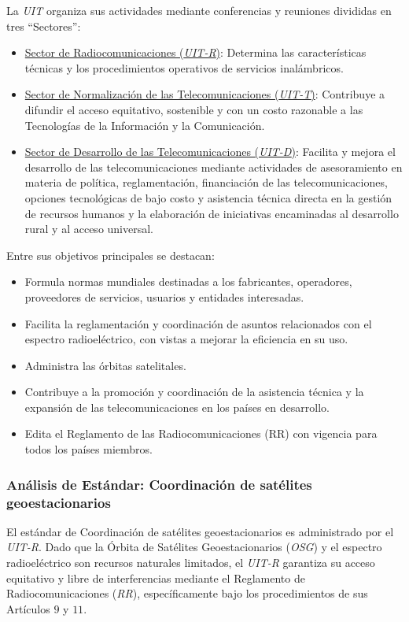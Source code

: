 \documentclass[12pt]{article}
\begin{document}
La \textit{UIT} organiza sus actividades mediante conferencias y reuniones divididas en tres ``Sectores'':
\begin{itemize}
    \item \underline{Sector de Radiocomunicaciones (\textit{UIT-R})}: Determina las características técnicas y los procedimientos operativos de servicios inalámbricos.
    \item \underline{Sector de Normalización de las Telecomunicaciones (\textit{UIT-T})}: Contribuye a difundir el acceso equitativo, sostenible y con un costo razonable a las Tecnologías de la Información y la Comunicación.
    \item \underline{Sector de Desarrollo de las Telecomunicaciones (\textit{UIT-D})}: Facilita y mejora el desarrollo de las telecomunicaciones mediante actividades de asesoramiento en materia de política, reglamentación, financiación de las telecomunicaciones, opciones tecnológicas de bajo costo y asistencia técnica directa en la gestión de recursos humanos y la elaboración de iniciativas encaminadas al desarrollo rural y al acceso universal.
\end{itemize}

Entre sus objetivos principales se destacan:
\begin{itemize}
    \item Formula normas mundiales destinadas a los fabricantes, operadores, proveedores de servicios, usuarios y entidades interesadas.
    \item Facilita la reglamentación y coordinación de asuntos relacionados con el espectro radioeléctrico, con vistas a mejorar la eficiencia en su uso.
    \item Administra las órbitas satelitales.
    \item Contribuye a la promoción y coordinación de la asistencia técnica y la expansión de las telecomunicaciones en los países en desarrollo.
    \item Edita el Reglamento de las Radiocomunicaciones (RR) con vigencia para todos los países miembros. \cite[p. 4-5]{b1}
\end{itemize}



\subsubsection{Análisis de Estándar: Coordinación de satélites geoestacionarios}
\label{sec_2.1.2}
El estándar de Coordinación de satélites geoestacionarios es administrado por el \textit{UIT-R}. Dado que la Órbita de Satélites Geoestacionarios (\textit{OSG}) y el espectro radioeléctrico son recursos naturales limitados, el \textit{UIT-R} garantiza su acceso equitativo y libre de interferencias mediante el Reglamento de Radiocomunicaciones (\textit{RR}), específicamente bajo los procedimientos de sus Artículos $9$ y $11$.
\end{document}
